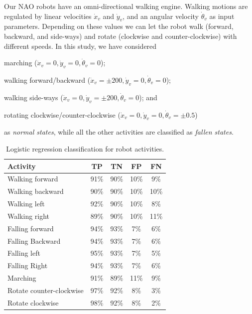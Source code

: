 \documentclass[letterpaper]{article}
\begin{document}
\begin{sloppy}
\begin{figure}[!ht]
\end{figure}


Our NAO robots have an omni-directional walking engine.  
Walking motions are regulated by linear velocities $\dot{x}_v$ and $\dot{y}_v$, and an 
angular velocity $\dot{\theta}_v$ as input parameters. Depending on these
values we can let the robot walk (forward, backward, and side-ways) and rotate (clockwise and
counter-clockwise) with different speeds. In this study, we have considered \begin{inparaenum}[(1)]
\item marching ($\dot{x}_v = 0 , \dot{y}_v = 0, \dot{\theta}_v = 0$); \item walking  
forward/backward ($\dot{x}_v = \pm200
, \dot{y}_v = 0, \dot{\theta}_v = 0$);  \item walking side-ways ($\dot{x}_v = 0, \dot{y}_v = 
\pm200, \dot{\theta}_v = 0$); and  \item rotating clockwise/counter-clockwise
($\dot{x}_v = 0 , \dot{y}_v = 0, \dot{\theta}_v = \pm 0.5$) \end{inparaenum} as {\em normal states}, 
while all the other activities are classified as {\em fallen states}. 

\begin{table}[!ht]
\caption{Logistic regression classification for robot activities.}
	\label{tab:robot-logistic-class}
	\centering
		\begin{tabular} {| l | c | c | c| c|}
		\hline
			{\bf Activity} & {\bf  TP}  &	{\bf TN}  &	{\bf FP} &	{\bf FN} \\ 
\hline
			Walking forward	& 91\%	& 90\%	& 10\%	& 9\% \\ \hline
			Walking backward	& 90\%	& 90\%	& 10\%	& 10\% \\ \hline
			Walking left 	& 92\%	& 90\%	& 10\%	& 8\% \\ \hline
			Walking right 	& 89\%	& 90\%	& 10\%	& 11\% \\ \hline
			Falling forward	& 94\%	& 93\%	& 7\%	& 6\%	 \\ \hline
			Falling Backward	& 94\%	& 93\%	& 7\%	& 6\%	 \\ \hline
			Falling left	& 95\%	& 93\%	& 7\%	& 5\%	 \\ \hline
			Falling Right	& 94\%	& 93\%	& 7\%	& 6\%	 \\ \hline
			Marching	& 91\%	& 89\%	& 11\%	& 9\%	 \\ \hline
			Rotate counter-clockwise	& 97\%	& 92\%	& 8\%	& 3\%	 \\ \hline
			Rotate clockwise	& 98\%	& 92\%	& 8\%	& 2\%	 \\ \hline
		\end{tabular}
\end{table}




\end{sloppy}
\end{document}
